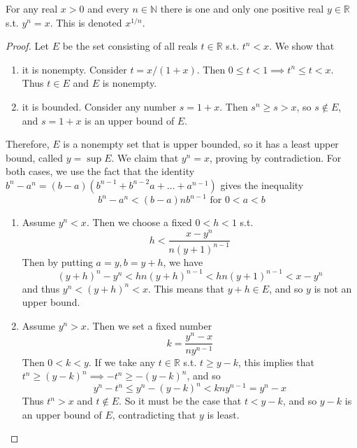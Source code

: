     \begin{theorem}
      For any real $x > 0$ and every $n \in \mathbb{N}$ there is one and only one positive real $y \in \mathbb{R}$ s.t. $y^n = x$. This is denoted $x^{1/n}$. 
    \end{theorem}
    \begin{proof}
      Let $E$ be the set consisting of all reals $t \in \mathbb{R}$ s.t. $t^n < x$. We show that 
      \begin{enumerate}
        \item it is nonempty. Consider $t = x/(1+x)$. Then $0 \leq t < 1 \implies t^n \leq t < x$. Thus $t \in E$ and $E$ is nonempty. 
        \item it is bounded. Consider any number $s = 1 + x$. Then $s^n \geq s > x$, so $s \not\in E$, and $s = 1 + x$ is an upper bound of $E$. 
      \end{enumerate}
      Therefore, $E$ is a nonempty set that is upper bounded, so it has a least upper bound, called $y = \sup{E}$. We claim that $y^n = x$, proving by contradiction. For both cases, we use the fact that the identity $b^n - a^n = (b - a) (b^{n-1} + b^{n-2} a + \ldots + a^{n-1})$ gives the inequality 
      \begin{equation}
        b^n - a^n < (b-a) n b^{n-1} \text{ for } 0 < a < b
      \end{equation}
      \begin{enumerate}
        \item Assume $y^n < x$. Then we choose a fixed $0 < h < 1$ s.t. 
        \begin{equation}
          h < \frac{x - y^n}{n(y + 1)^{n-1}}
        \end{equation}
        Then by putting $a = y, b = y + h$, we have 
        \begin{equation}
          (y + h)^n - y^n < hn (y + h)^{n-1} < hn (y + 1)^{n-1} < x - y^n 
        \end{equation}
        and thus $y^n < (y + h)^n < x$. This means that $y + h \in E$, and so $y$ is not an upper bound. 

        \item Assume $y^n > x$. Then we set a fixed number 
        \begin{equation}
          k = \frac{y^n - x}{n y^{n-1}} 
        \end{equation}
        Then $0 < k < y$. If we take any $t \in \mathbb{R}$ s.t. $t \geq y - k$, this implies that $t^n \geq (y -k)^n \implies -t^n \geq -(y - k)^n$, and so 
        \begin{equation}
          y^n - t^n \leq y^n - (y - k)^n < k ny^{n-1} = y^n - x
        \end{equation}
        Thus $t^n > x$ and $t \not\in E$. So it must be the case that $t < y - k$, and so $y - k$ is an upper bound of $E$, contradicting that $y$ is least. 
      \end{enumerate}
    \end{proof}

